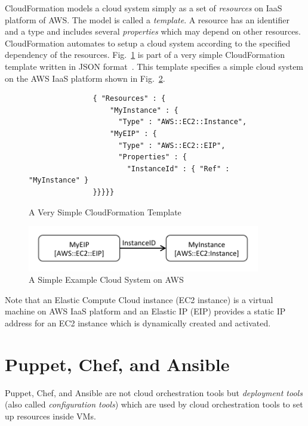 \documentclass[12pt]{report}
\begin{document}
CloudFormation models a cloud system simply as a set of {\it
  resources} on IaaS platform of AWS. The model is called a {\it
  template}. A resource has an identifier and a type and includes
several {\it properties} which may depend on other
resources. CloudFormation automates to setup a cloud system according
to the specified dependency of the
resources. Fig.~\ref{fig:AWSExample} is part of a very simple
CloudFormation template written in JSON format~\cite{JSON}.
This template specifies a simple cloud system on the AWS IaaS platform
shown in Fig.~\ref{fig:exampleaws}.
\begin{figure}
\small
\begin{verbatim}
               { "Resources" : {
                   "MyInstance" : {
                     "Type" : "AWS::EC2::Instance",
                   "MyEIP" : {
                     "Type" : "AWS::EC2::EIP",
                     "Properties" : {
                       "InstanceId" : { "Ref" : "MyInstance" }
               }}}}}
\end{verbatim}
\normalsize
\vspace{-0.6cm}
\caption{A Very Simple CloudFormation Template}
\label{fig:AWSExample}
\end{figure}
\begin{figure}
\centering
\includegraphics[height=2cm,natwidth=396,natheight=78]{./exaws.png}
\vspace{-0.6cm}
\caption{A Simple Example Cloud System on AWS}
\label{fig:exampleaws}
\end{figure}
Note that an Elastic Compute Cloud instance (EC2 instance) is a
virtual machine on AWS IaaS platform and an Elastic IP (EIP)
provides a static IP address for an EC2 instance which is dynamically
created and activated.

\section{Puppet, Chef, and Ansible}
\label{sec:PCA}
Puppet, Chef, and Ansible are not cloud orchestration tools but {\it
  deployment tools} (also called {\it configuration tools}) which are
used by cloud orchestration tools to set up resources inside VMs.
\end{document}
